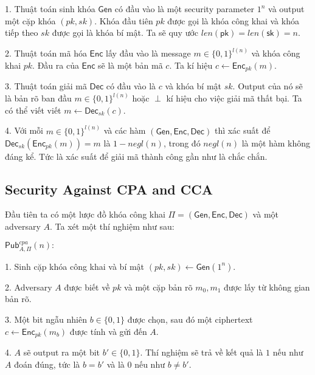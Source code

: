 \documentclass[12pt]{article}
\begin{document}
1. Thuật toán sinh khóa $\displaystyle \mathsf{Gen}$ có đầu vào là một security parameter $\displaystyle 1^{n}$ và output một cặp khóa $\displaystyle ( pk,sk)$. Khóa đầu tiên $\displaystyle pk$ được gọi là khóa công khai và khóa tiếp theo $\displaystyle sk$ được gọi là khóa bí mật. Ta sẽ quy ước $\displaystyle len(\mathsf{pk}) =len(\mathsf{sk}) =n$. 

2. Thuật toán mã hóa $\displaystyle \mathsf{Enc}$ lấy đầu vào là message $\displaystyle m\in \{0,1\}^{l( n)}$ và khóa công khai $\displaystyle pk$. Đầu ra của $\displaystyle \mathsf{Enc}$ sẽ là một bản mã $\displaystyle c$. Ta kí hiệu $\displaystyle c\leftarrow \mathsf{Enc}_{pk}( m)$.

3. Thuật toán giải mã $\displaystyle \mathsf{Dec}$ có đầu vào là $\displaystyle c$ và khóa bí mật $\displaystyle sk$. Output của nó sẽ là bản rõ ban đầu $\displaystyle m\in \{0,1\}^{l( n)}$ hoặc $\displaystyle \perp $ kí hiệu cho việc giải mã thất bại. Ta có thể viết viết $\displaystyle m\leftarrow \mathsf{Dec}_{sk}( c)$.

4. Với mỗi $\displaystyle m\in \{0,1\}^{l( n)}$ và các hàm $\displaystyle (\mathsf{Gen} ,\mathsf{Enc} ,\mathsf{Dec} )$ thì xác suất để $\displaystyle \mathsf{Dec}_{sk}(\mathsf{Enc}_{pk}( m)) =m$ là $\displaystyle 1-negl( n)$, trong đó $\displaystyle negl( n)$ là một hàm không đáng kể. Tức là xác suất để giải mã thành công gần như là chắc chắn. 


\subsection{Security Against CPA and CCA}

Đầu tiên ta có một lược đồ khóa công khai $\displaystyle \Pi =(\mathsf{Gen} ,\mathsf{Enc} ,\mathsf{Dec} )$ và một adversary $\displaystyle A$. Ta xét một thí nghiệm như sau: 

\begin{mybox}
{\begin{exe}
$\displaystyle \mathsf{Pub}_{A,\Pi }^{cpa}( n) :$
\end{exe}}

1. Sinh cặp khóa công khai và bí mật $\displaystyle ( pk,sk)\leftarrow \mathsf{Gen}\left( 1^{n}\right)$.

2. Adversary $\displaystyle A$ được biết về $\displaystyle pk$ và một cặp bản rõ $\displaystyle m_{0} ,m_{1}$ được lấy từ không gian bản rõ. 

3. Một bit ngẫu nhiên $\displaystyle b\in \{0,1\}$ được chọn, sau đó một ciphertext $\displaystyle c\leftarrow \mathsf{Enc}_{pk}( m_{b})$ được tính và gửi đến $\displaystyle A$. 

4. $\displaystyle A$ sẽ output ra một bit $\displaystyle b'\in \{0,1\}$. Thí nghiệm sẽ trả về kết quả là $\displaystyle 1$ nếu như $\displaystyle A$ đoán đúng, tức là $\displaystyle b=b'$ và là $\displaystyle 0$ nếu như $\displaystyle b\neq b'$. 
\end{mybox}
\end{document}
